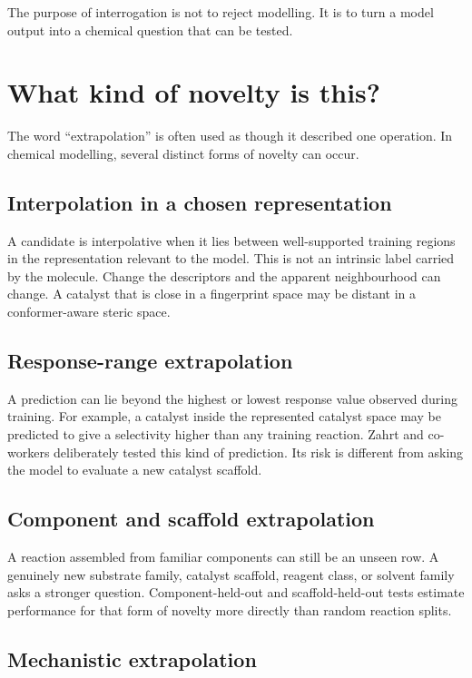 The purpose of interrogation is not to reject modelling.
It is to turn a model output into a chemical question that can be tested.

\section{What kind of novelty is this?}

The word ``extrapolation'' is often used as though it described one operation.
In chemical modelling, several distinct forms of novelty can occur.

\subsection{Interpolation in a chosen representation}

A candidate is interpolative when it lies between well-supported training regions in the representation relevant to the model.
This is not an intrinsic label carried by the molecule.
Change the descriptors and the apparent neighbourhood can change.
A catalyst that is close in a fingerprint space may be distant in a conformer-aware steric space.

\subsection{Response-range extrapolation}

A prediction can lie beyond the highest or lowest response value observed during training.
For example, a catalyst inside the represented catalyst space may be predicted to give a selectivity higher than any training reaction.
Zahrt and co-workers deliberately tested this kind of prediction.
Its risk is different from asking the model to evaluate a new catalyst scaffold.

\subsection{Component and scaffold extrapolation}

A reaction assembled from familiar components can still be an unseen row.
A genuinely new substrate family, catalyst scaffold, reagent class, or solvent family asks a stronger question.
Component-held-out and scaffold-held-out tests estimate performance for that form of novelty more directly than random reaction splits.

\subsection{Mechanistic extrapolation}

